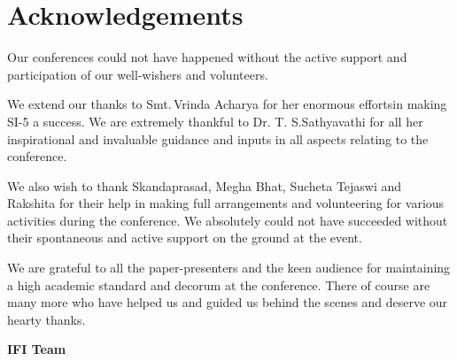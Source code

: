 
\chapter*{Acknowledgements}\label{ack}

Our conferences could not have happened without the active support and participation of our well-wishers and volunteers.

We extend our thanks to Smt.\,Vrinda Acharya for her enormous efforts\break in making SI-5 a success. We are extremely thankful to Dr. T. S.\break Sathyavathi for all her inspirational and invaluable guidance and inputs in all aspects relating to the conference.

We also wish to thank Skandaprasad, Megha Bhat, Sucheta Tejaswi and Rakshita for their help in making full arrangements and volunteering for various activities during the conference. We absolutely could not have succeeded without their spontaneous and active support on the ground at the event.

We are grateful to all the paper-presenters and the keen audience for maintaining a high academic standard and decorum at the conference. There of course are many more who have helped us and guided us behind the scenes and deserve our hearty thanks.

\begin{flushright}
\textbf{IFI Team}
\end{flushright}

